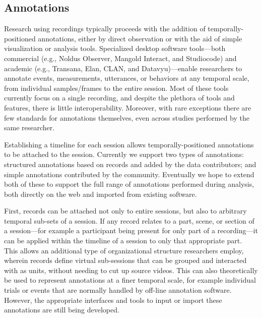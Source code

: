 \documentclass{sig-alternate}
\begin{document}
\subsection{Annotations}


Research using recordings typically proceeds with the addition of temporally-positioned annotations, either by direct observation or with the aid of simple visualization or analysis tools.
Specialized desktop software tools---both commercial (e.g., Noldus Observer, Mangold Interact, and Studiocode) and academic (e.g., Transana, Elan, CLAN, and Datavyu)---enable researchers to annotate events, measurements, utterances, or behaviors at any temporal scale, from individual samples/frames to the entire session.
Most of these tools currently focus on a single recording, and despite the plethora of tools and features, there is little interoperability.
Moreover, with rare exceptions \cite{MacWhinney2001} there are few standards for annotations themselves, even across studies performed by the same researcher. 

Establishing a timeline for each session allows temporally-positioned annotations to be attached to the session.
Currently we support two types of annotations: structured annotations based on records and added by the data contributors; and simple annotations contributed by the community.
Eventually we hope to extend both of these to support the full range of annotations performed during analysis, both directly on the web and imported from existing software.

First, records can be attached not only to entire sessions, but also to arbitrary temporal sub-sets of a session.
If any record relates to a part, scene, or section of a session---for example a participant being present for only part of a recording---it can be applied within the timeline of a session to only that appropriate part.
This allows an additional type of organizational structure researchers employ, wherein records define virtual sub-sessions that can be grouped and interacted with as units, without needing to cut up source videos.
This can also theoretically be used to represent annotations at a finer temporal scale, for example individual trials or events that are normally handled by off-line annotation software.
However, the appropriate interfaces and tools to input or import these annotations are still being developed.
\end{document}
